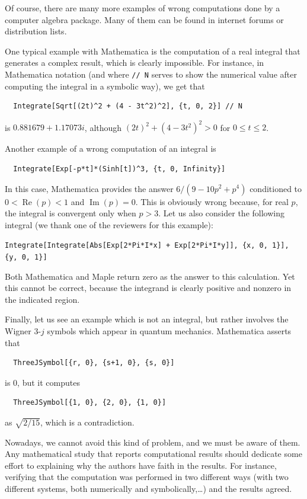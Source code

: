 \documentclass[12pt]{article}
\begin{document}
Of course, there are many more examples of wrong computations done by a computer algebra package. Many of them can be found in internet forums or distribution lists. 

One typical example with Mathematica is the computation of a real integral that generates a complex result, which is clearly impossible. For instance, in Mathematica notation (and where \texttt{//~N} serves to show the numerical value after computing the integral in a symbolic way), we get that
\begin{verbatim}
  Integrate[Sqrt[(2t)^2 + (4 - 3t^2)^2], {t, 0, 2}] // N
\end{verbatim}
is $0.881679 + 1.17073 i$, although $(2t)^2 + (4 - 3t^2)^2 > 0$ for $ 0 \le t \le 2$.

Another example of a wrong computation of an integral is
\begin{verbatim}
  Integrate[Exp[-p*t]*(Sinh[t])^3, {t, 0, Infinity}]
\end{verbatim}
In this case, Mathematica provides the answer $6/(9-10p^2+p^4)$ conditioned to $0 < \operatorname{Re}(p) < 1$ and $\operatorname{Im}(p) = 0$. This is obviously wrong because, for real $p$, the integral is convergent only when $p>3$.
Let us also consider the following integral (we thank one of the reviewers for this example): 
\begin{center}
\verb|Integrate[Integrate[Abs[Exp[2*Pi*I*x] + Exp[2*Pi*I*y]], {x, 0, 1}], {y, 0, 1}]|
\end{center}
Both Mathematica and Maple return zero as the answer to this calculation.
Yet this cannot be correct, because the integrand is clearly positive and nonzero in the indicated region.

Finally, let us see an example which is not an integral, but rather involves the Wigner 3-$j$ symbols which appear in quantum mechanics. Mathematica asserts that
\begin{verbatim}
  ThreeJSymbol[{r, 0}, {s+1, 0}, {s, 0}]
\end{verbatim}
is $0$, but it computes 
\begin{verbatim}
  ThreeJSymbol[{1, 0}, {2, 0}, {1, 0}]
\end{verbatim}
as $\sqrt{2/15}$, which is a contradiction.

Nowadays, we cannot avoid this kind of problem, and we must be aware of them.
Any mathematical study that reports computational results should dedicate some effort to  explaining why the authors have faith in the results. For instance, verifying that the computation was performed in two different ways (with two different systems, both numerically and symbolically,\dots) and the results agreed.
\end{document}
